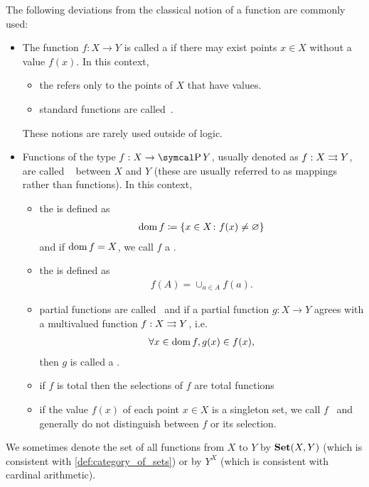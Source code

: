 \begin{definition}
  The following deviations from the classical notion of a function are commonly used:
  \begin{itemize}
    \item\label{def:function/partial} The function $f: X \to Y$ is called a if there may exist points $x \in X$ without a value $f(x)$. In this context,
    \begin{itemize}
      \item the  refers only to the points of $X$ that have values.
      \item standard functions are called~.
    \end{itemize}

    These notions are rarely used outside of logic.

    \item\label{def:function/multivalued} Functions of the type $f: X \to \Power Y$, usually denoted as $f: X \rightrightarrows Y$, are called ~ between $X$ and $Y$ (these are usually referred to as mappings rather than functions). In this context,
    \begin{itemize}
      \item the  is defined as
      \begin{align*}
        \operatorname{dom} f \coloneqq \{ x \in X \colon f(x) \neq \varnothing \}
      \end{align*}
      and if $\operatorname{dom} f = X$, we call $f$ a .

      \item the  is defined as
      \begin{align*}
        f(A) = \cup_{a \in A} f(a).
      \end{align*}

      \item partial functions are called~ and if a partial function $g: X \to Y$ agrees with a multivalued function $f: X \rightrightarrows Y$, i.e.
      \begin{align*}
        \forall x \in \operatorname{dom} f, g(x) \in f(x),
      \end{align*}
      then $g$ is called a .

      \item if $f$ is total then the selections of $f$ are total functions

      \item if the value $f(x)$ of each point $x \in X$ is a singleton set, we call $f$~ and generally do not distinguish between $f$ or its selection.
    \end{itemize}
  \end{itemize}

  We sometimes denote the set of all functions from $X$ to $Y$ by $\operatorname{\mathbf{Set}}(X, Y)$ (which is consistent with \cref{def:category_of_sets}) or by $Y^X$ (which is consistent with cardinal arithmetic).
\end{definition}

